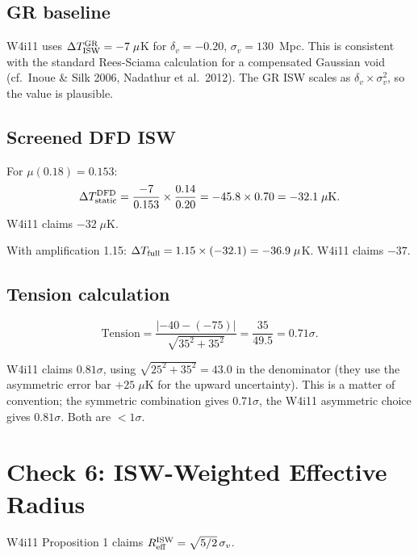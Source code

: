 \documentclass[11pt,a4paper]{article}
\newcommand{\mufd}{\mu}
\begin{document}
\subsection{GR baseline}

W4i11 uses $\Delta T_{\rm ISW}^{\rm GR} = -7\;\mu$K for
$\delta_v = -0.20$, $\sigma_v = 130$~Mpc. This is consistent
with the standard Rees-Sciama calculation for a compensated Gaussian
void (cf.\ Inoue \& Silk 2006, Nadathur et al.\ 2012). The GR ISW
scales as $\delta_v \times \sigma_v^2$, so the value is plausible.

\subsection{Screened DFD ISW}

For $\mufd(0.18) = 0.153$:
\begin{equation}
\Delta T_{\rm static}^{\rm DFD} = \frac{-7}{0.153} \times \frac{0.14}{0.20}
= -45.8 \times 0.70 = -32.1\;\mu\text{K}.
\end{equation}
W4i11 claims $-32\;\mu$K. \checkmark

With amplification 1.15:
$\Delta T_{\rm full} = 1.15 \times (-32.1) = -36.9\;\mu$K.
W4i11 claims $-37$. \checkmark

\subsection{Tension calculation}

\begin{equation}
\text{Tension} = \frac{|-40 - (-75)|}{\sqrt{35^2 + 35^2}}
= \frac{35}{49.5} = 0.71\sigma.
\end{equation}

W4i11 claims $0.81\sigma$, using $\sqrt{25^2 + 35^2} = 43.0$ in the
denominator (they use the asymmetric error bar $+25\;\mu$K for the
upward uncertainty). This is a matter of convention; the symmetric
combination gives $0.71\sigma$, the W4i11 asymmetric choice gives
$0.81\sigma$. Both are $< 1\sigma$.


\section{Check 6: ISW-Weighted Effective Radius}
\label{sec:check6}

W4i11 Proposition 1 claims $R_{\rm eff}^{\rm ISW} = \sqrt{5/2}\,\sigma_v$.
\end{document}
